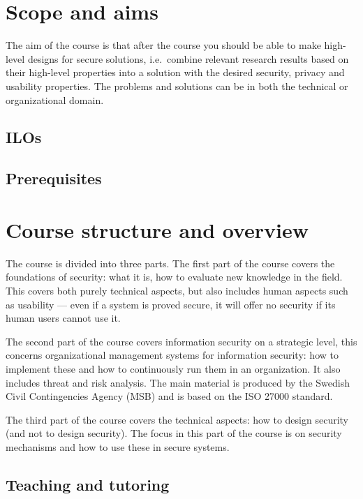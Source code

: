 \section{Scope and aims}%
\label{sec:aim}
The aim of the course is that after the course you should be able to make 
high-level designs for secure solutions, i.e.\ combine relevant research results 
based on their high-level properties into a solution with the desired security, 
privacy and usability properties.
The problems and solutions can be in both the technical or organizational 
domain.

\subsection{\Aclp*{ILO}}


\subsection{Prerequisites}



\section{Course structure and overview}%
\label{CourseStructure}

The course is divided into three parts.
The first part of the course covers the foundations of security: what it is, 
how to evaluate new knowledge in the field.
This covers both purely technical aspects, but also includes human aspects such
as usability --- even if a system is proved secure, it will offer no security 
if its human users cannot use it.

The second part of the course covers information security on a strategic level, 
this concerns organizational management systems for information security: how 
to implement these and how to continuously run them in an organization.
It also includes threat and risk analysis.
The main material is produced by the Swedish Civil Contingencies Agency (MSB) 
and is based on the ISO 27000 standard.

The third part of the course covers the technical aspects: how to design 
security (and not to design security).
The focus in this part of the course is on security mechanisms and how to use 
these in secure systems.

\subsection{Teaching and tutoring}

